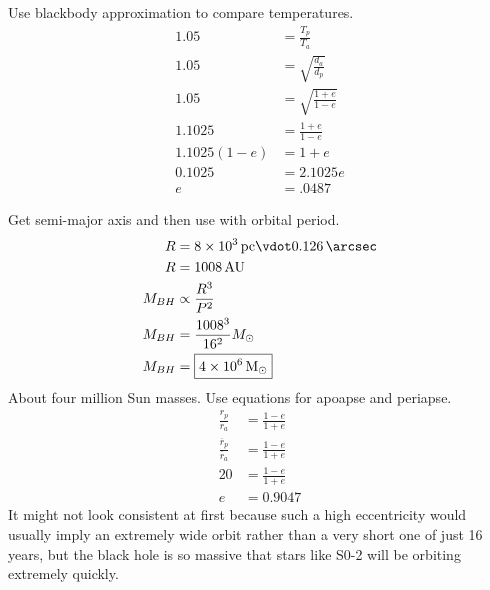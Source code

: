 \documentclass{homework}
\begin{document}
\maketitle
\question
Use blackbody approximation to compare temperatures.
\begin{align*}
    1.05	&=  \frac{T_p}{T_a} \\
    1.05    &=	\sqrt{\frac{d_a}{d_p}}	\\
    1.05    &=	\sqrt{\frac{1+e}{1-e}}	\\
    1.1025    &=	\frac{1+e}{1-e}	\\
    1.1025(1-e)    &=	1+e	\\
    0.1025    &=	2.1025e	\\
    e   &=  \boxed{.0487}
\end{align*}


\question
\begin{alphaparts}
    \questionpart Get semi-major axis and then use with orbital period.
    \begin{align*}
        R	&=	\SI{8e3}{pc} \vdot \SI{0.126}{\arcsec}	\\
        R    &=  \SI{1008}{AU}   \\
        M_{BH}    &\propto	\frac{R^3}{P^2}	\\
        M_{BH}    &=	\frac{1008^3}{16^2} M_\odot	\\
        M_{BH}    &=	\boxed{\SI{4e6}{M_\odot}}
    \end{align*}
    About four million Sun masses.
    \questionpart Use equations for apoapse and periapse.
    \begin{align*}
        \frac{r_p}{r_a}	&=	\frac{1-e}{1+e}	\\
        \frac{\ddot{r_p}}{\ddot{r_a}}	&=	\frac{1-e}{1+e}	\\
        20	&=	\frac{1-e}{1+e}	\\
        e   &=  \boxed{0.9047}
    \end{align*}
    \questionpart It might not look consistent at first because such a high eccentricity would usually imply an extremely wide orbit rather than a very short one of just 16 years, but the black hole is so massive that stars like S0-2 will be orbiting extremely quickly.
\end{alphaparts}
\end{document}
